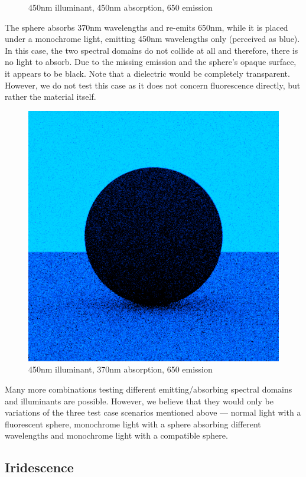 \begin{description}
\begin{figure}[H]
		\caption{450nm illuminant, 450nm absorption, 650 emission}
		\label{fig:fluorescent_sphere_mono_red}
	\end{figure}
	\item[450nm illuminant, 370nm absorption, 650 emission~\ref{fig:fluorescent_sphere_mono_invisible}] The sphere absorbs 370nm wavelengths and re-emits 650nm, while it is placed under a monochrome light, emitting 450nm wavelengths only (perceived as blue). In this case, the two spectral domains do not collide at all and therefore, there is no light to absorb. Due to the missing emission and the sphere's opaque surface, it appears to be black. Note that a dielectric would be completely transparent. However, we do not test this case as it does not concern fluorescence directly, but rather the material itself.
	\begin{figure}[H]
		\centering
		\includegraphics[width=.6\linewidth]{img/fluorescent_sphere_mono_invisible.png}
		\caption{450nm illuminant, 370nm absorption, 650 emission}
		\label{fig:fluorescent_sphere_mono_invisible}
	\end{figure}
\end{description}

Many more combinations testing different emitting/absorbing spectral domains and illuminants are possible. However, we believe that they would only be variations of the three test case scenarios mentioned above --- normal light with a fluorescent sphere, monochrome light with a sphere absorbing different wavelengths and monochrome light with a compatible sphere.

\subsection{Iridescence}

